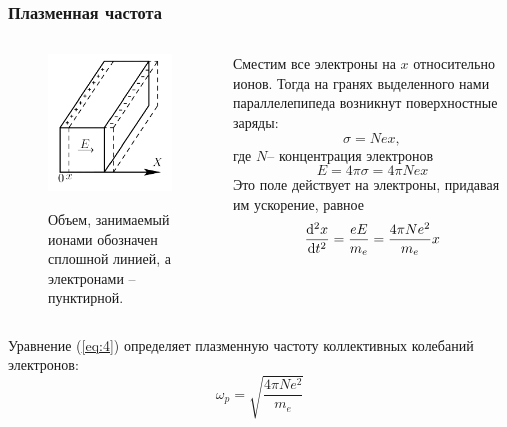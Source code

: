 \documentclass[10pt,pdf,hyperref={unicode}, dvipsnames]{beamer}
\begin{document}
\begin{frame}[t]\frametitle{Плазменная частота}
\begin{minipage}[0.2\textheight]{\textwidth}
	\begin{columns}[T]
		\begin{column}{0.4\textwidth}
			\begin{figure}[tr]
				\vspace{0pt}
				\centering
				\includegraphics[]{fig/plasmfreq}
				\vspace{-10pt}
				\label{fig:plasmfreq}
				\caption*{Объем, занимаемый ионами обозначен сплошной линией, а электронами -- пунктирной.}
			\end{figure}
		\end{column}


		\begin{column}{0.6\textwidth}
			Сместим все электроны на $x$ относительно ионов. Тогда на гранях выделенного нами параллелепипеда возникнут поверхностные заряды:
			\begin{equation}
			\sigma = Nex,
			\end{equation}
			где $N$-- концентрация электронов
			\begin{equation}
				E=4\pi\sigma=4\pi Nex
			\end{equation}
			Это поле действует на электроны, придавая им ускорение, равное
			\begin{equation}
				\label{eq:4}
				\dv[2]{x}{t}=\frac{eE}{m_e}=\frac{4\pi N e^2}{m_e}x
			\end{equation}
		\end{column}

	\end{columns}
\end{minipage}
\vfill
Уравнение (\ref{eq:4}) определяет плазменную частоту коллективных колебаний электронов:
\begin{equation}
	\omega_p=\sqrt{\frac{4\pi N e^2}{m_e}}
\end{equation}



\end{frame}
\end{document}
